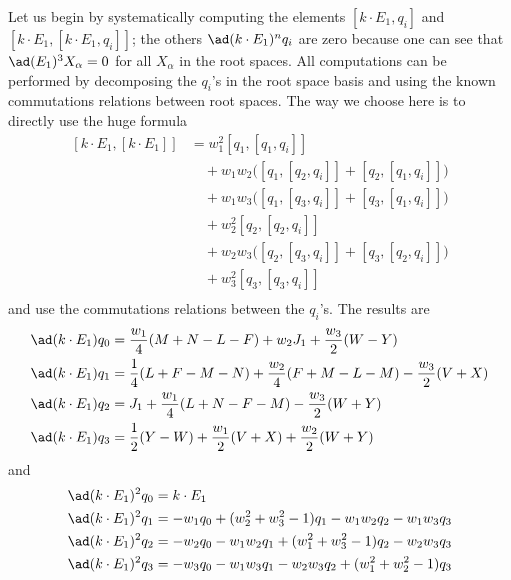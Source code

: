 Let us begin by systematically computing the elements $[k\cdot E_1,q_i]$ and $[k\cdot E_1,[k\cdot E_1,q_i]]$; the others $\ad(k\cdot E_1)^nq_i$ are zero because one can see that $\ad(E_1)^3X_{\alpha}=0$ for all $X_{\alpha}$ in the root spaces. All computations can be performed by decomposing the $q_i$'s in the root space basis and using the known commutations relations between root spaces. The way we choose here is to directly use the huge formula
\begin{equation}
	\begin{split}
		[k\cdot E_1,[k\cdot E_1]]&=w_1^2[q_1,[q_1,q_i]]\\
		&\quad +w_1w_2\big(  [q_1,[q_2,q_i]]+[q_2,[q_1,q_i]]  \big)\\
		&\quad +w_1w_3\big(  [q_1,[q_3,q_i]]+[q_3,[q_1,q_i]]  \big)\\
		&\quad +w_2^2[q_2,[q_2,q_i]]\\
		&\quad +w_2w_3\big(  [q_2,[q_3,q_i]]+[q_3,[q_2,q_i]]  \big)\\
		&\quad +w_3^2[q_3,[q_3,q_i]]\\
	\end{split}
\end{equation}
and use the commutations relations between the $q_i$'s. The results are
\begin{equation}
	\begin{split}
		\ad(k\cdot E_1)q_0 &=\frac{w_1}{4}(M+N-L-F)+w_2J_1+\frac{w_3}{2}(W-Y)\\
		\ad(k\cdot E_1)q_1 &=\frac{1}{4}(L+F-M-N)+\frac{w_2}{4}(F+M-L-M)-\frac{w_3}{2}(V+X)\\
		\ad(k\cdot E_1)q_2 &=J_1+\frac{w_1}{4}(L+N-F-M)-\frac{w_3}{2}(W+Y)\\
		\ad(k\cdot E_1)q_3 &=\frac{1}{2}(Y-W)+\frac{w_1}{2}(V+X)+\frac{w_2}{2}(W+Y)\\
	\end{split}
\end{equation}
and
\begin{equation}
	\begin{split}
		\ad(k\cdot E_1)^2q_0 &=k\cdot E_1\\
		\ad(k\cdot E_1)^2q_1 &=-w_1q_0+(w_2^2+w_3^2-1)q_1-w_1w_2q_2-w_1w_3q_3\\
		\ad(k\cdot E_1)^2q_2 &=-w_2q_0-w_1w_2q_1+(w_1^2+w_3^2-1)q_2-w_2w_3q_3\\
		\ad(k\cdot E_1)^2q_3 &=-w_3q_0-w_1w_3q_1-w_2w_3q_2+(w_1^2+w_2^2-1)q_3\\
	\end{split}
\end{equation}
